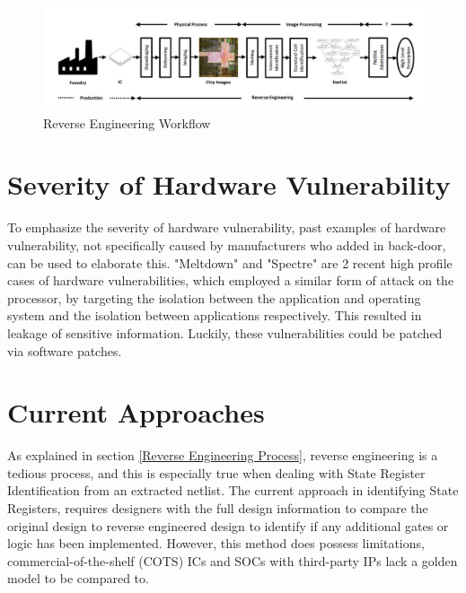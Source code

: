 \documentclass{tum-book}
\begin{document}
    \begin{figure}[ht]
        \centering
        \includegraphics[scale=0.4]{myFiles/myImages/Reverse_Engineering_Process.png}
        \caption{Reverse Engineering Workflow\cite{baehr2020machine}}
        \label{fig:Reverse Engineering Workflow}
    \end{figure}
    
    
    \newpage\section{Severity of Hardware Vulnerability}\label{Severity of Hardware Vulnerability}
    To emphasize the severity of hardware vulnerability, past examples of hardware vulnerability, not specifically caused by manufacturers who added in back-door, can be used to elaborate this. "Meltdown"\cite{Lipp2018meltdown} and "Spectre"\cite{Kocher2018spectre} are 2 recent high profile cases of hardware vulnerabilities, which employed a similar form of attack on the processor, by targeting the isolation between the application and operating system and the isolation between applications respectively. This resulted in leakage of sensitive information. Luckily, these vulnerabilities could be patched via software patches.
    
    
    \section{Current Approaches}
    As explained in section \ref{Reverse Engineering Process}, reverse engineering is a tedious process, and this is especially true when dealing with State Register Identification from an extracted netlist. The current approach in identifying State Registers, requires designers with the full design information to compare the original design to reverse engineered design to identify if any additional gates or logic has been implemented. However, this method does possess limitations, commercial-of-the-shelf (COTS) ICs and SOCs with third-party IPs lack a golden model to be compared to.
    
\end{document}
